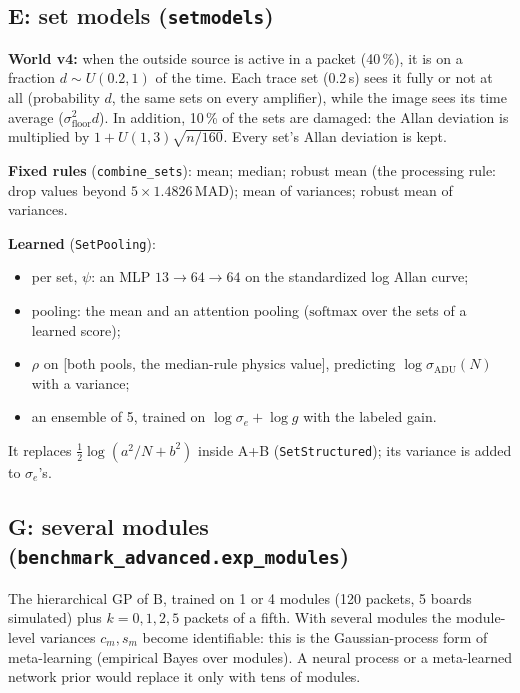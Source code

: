 \documentclass[10pt]{article}
\newcommand{\code}[1]{\texttt{#1}}
\begin{document}
\subsection{E: set models (\code{setmodels})}
\begin{advanced}
\textbf{World v4:} when the outside source is active in a packet (40\,\%), it is on a fraction $d \sim U(0.2,1)$ of the time. Each trace set
(0.2\,s) sees it fully or not at all (probability $d$, the same sets on every amplifier), while the image sees its time average
($\sigma_\text{floor}^2 d$). In addition, 10\,\% of the sets are damaged: the Allan deviation is multiplied by
$1 + U(1,3)\sqrt{n/160}$. Every set's Allan deviation is kept.

\textbf{Fixed rules} (\code{combine\_sets}): mean; median; robust mean (the processing rule: drop values beyond
$5 \times 1.4826$\,MAD); mean of variances; robust mean of variances.

\textbf{Learned} (\code{SetPooling}):
\begin{itemize}
\item per set, $\psi$: an MLP $13 \to 64 \to 64$ on the standardized log Allan curve;
\item pooling: the mean and an attention pooling ($\text{softmax}$ over the sets of a learned score);
\item $\rho$ on [both pools, the median-rule physics value], predicting $\log\sigma_\text{ADU}(N)$ with a variance;
\item an ensemble of 5, trained on $\log\sigma_e + \log g$ with the labeled gain.
\end{itemize}
It replaces $\tfrac12\log(a^2/N+b^2)$ inside A+B (\code{SetStructured}); its variance is added to $\sigma_e$'s.
\end{advanced}

\subsection{G: several modules (\code{benchmark\_advanced.exp\_modules})}
\begin{advanced}
The hierarchical GP of B, trained on 1 or 4 modules (120 packets, 5 boards simulated) plus $k = 0, 1, 2, 5$ packets of a fifth. With
several modules the module-level variances $c_m, s_m$ become identifiable: this is the Gaussian-process form of meta-learning
(empirical Bayes over modules). A neural process or a meta-learned network prior would replace it only with tens of modules.
\end{advanced}
\end{document}
